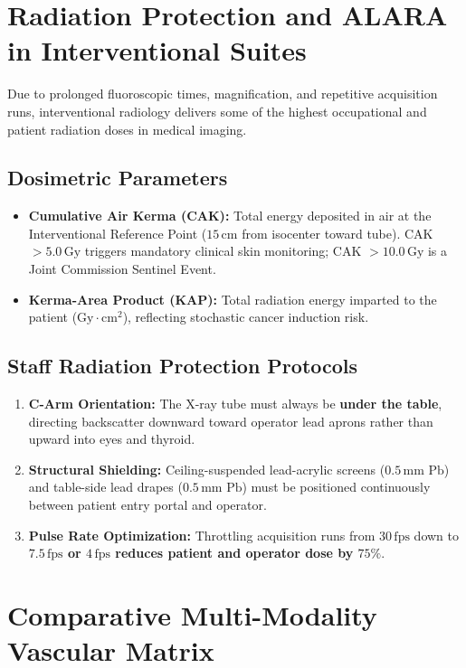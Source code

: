 \documentclass[11pt,a4paper]{article}
\begin{document}
\newpage
\section{Radiation Protection and ALARA in Interventional Suites}

Due to prolonged fluoroscopic times, magnification, and repetitive acquisition runs, interventional radiology delivers some of the highest occupational and patient radiation doses in medical imaging.

\subsection{Dosimetric Parameters}
\begin{itemize}[leftmargin=*]
    \item \textbf{Cumulative Air Kerma (CAK):} Total energy deposited in air at the Interventional Reference Point ($15\,\text{cm}$ from isocenter toward tube). CAK $> 5.0\,\text{Gy}$ triggers mandatory clinical skin monitoring; CAK $> 10.0\,\text{Gy}$ is a Joint Commission Sentinel Event.
    \item \textbf{Kerma-Area Product (KAP):} Total radiation energy imparted to the patient ($\text{Gy}\cdot\text{cm}^2$), reflecting stochastic cancer induction risk.
\end{itemize}

\subsection{Staff Radiation Protection Protocols}
\begin{enumerate}[leftmargin=*]
    \item \textbf{C-Arm Orientation:} The X-ray tube must always be \textbf{under the table}, directing backscatter downward toward operator lead aprons rather than upward into eyes and thyroid.
    \item \textbf{Structural Shielding:} Ceiling-suspended lead-acrylic screens ($0.5\,\text{mm Pb}$) and table-side lead drapes ($0.5\,\text{mm Pb}$) must be positioned continuously between patient entry portal and operator.
    \item \textbf{Pulse Rate Optimization:} Throttling acquisition runs from $30\,\text{fps}$ down to \textbf{$7.5\,\text{fps}$ or $4\,\text{fps}$ reduces patient and operator dose by $75\%$}.
\end{enumerate}

\newpage
\section{Comparative Multi-Modality Vascular Matrix}
\end{document}
